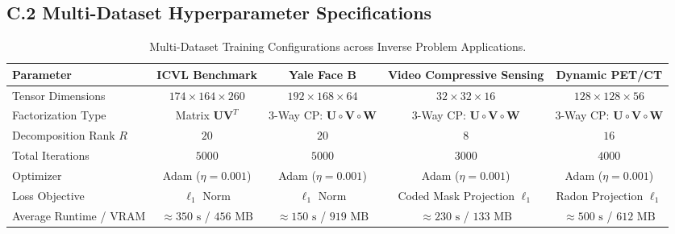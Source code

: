\subsection*{C.2 Multi-Dataset Hyperparameter Specifications}
\begin{table}[htbp]
\centering
\caption{Multi-Dataset Training Configurations across Inverse Problem Applications.}
\label{tab:multi_dataset_hyperparams}
\begin{adjustbox}{width=\textwidth}
\begin{tabular}{lcccc}
\toprule
\textbf{Parameter} & \textbf{ICVL Benchmark} & \textbf{Yale Face B} & \textbf{Video Compressive Sensing} & \textbf{Dynamic PET/CT} \\
\midrule
Tensor Dimensions & $174 \times 164 \times 260$ & $192 \times 168 \times 64$ & $32 \times 32 \times 16$ & $128 \times 128 \times 56$ \\
Factorization Type & Matrix $\mathbf{U} \mathbf{V}^T$ & 3-Way CP: $\mathbf{U} \circ \mathbf{V} \circ \mathbf{W}$ & 3-Way CP: $\mathbf{U} \circ \mathbf{V} \circ \mathbf{W}$ & 3-Way CP: $\mathbf{U} \circ \mathbf{V} \circ \mathbf{W}$ \\
Decomposition Rank $R$ & $20$ & $20$ & $8$ & $16$ \\
Total Iterations & $5000$ & $5000$ & $3000$ & $4000$ \\
Optimizer & Adam ($\eta = 0.001$) & Adam ($\eta = 0.001$) & Adam ($\eta = 0.001$) & Adam ($\eta = 0.001$) \\
Loss Objective & $\ell_1$ Norm & $\ell_1$ Norm & Coded Mask Projection $\ell_1$ & Radon Projection $\ell_1$ \\
Average Runtime / VRAM & $\approx 350\text{ s}$ / $456\text{ MB}$ & $\approx 150\text{ s}$ / $919\text{ MB}$ & $\approx 230\text{ s}$ / $133\text{ MB}$ & $\approx 500\text{ s}$ / $612\text{ MB}$ \\
\bottomrule
\end{tabular}
\end{adjustbox}
\end{table}

